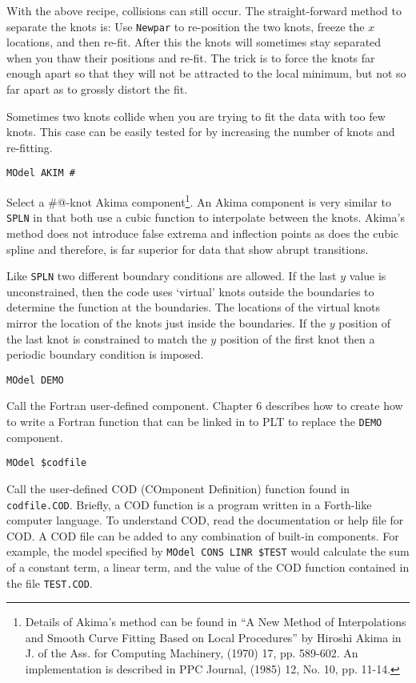 With the above recipe, collisions can still occur.  The straight-forward
method to separate the knots is:  Use {\tt Newpar} to re-position the two
knots, freeze the $x$ locations, and then re-fit.  After this the knots
will sometimes stay separated when you thaw their positions and re-fit.
The trick is to force the knots far enough apart so that they will
not be attracted to the local minimum, but not so far apart as to grossly
distort the fit.

Sometimes two knots collide when you are trying to fit the data with
too few knots.  This case can be easily tested for by increasing the
number of knots and re-fitting.

\medskip\begin{verbatim}
MOdel AKIM #
\end{verbatim}
Select a \verb@#@-knot Akima component\footnote{
Details of Akima's method can be found in ``A New Method of
Interpolations and Smooth Curve Fitting Based on Local Procedures''
by Hiroshi Akima in J.  of the Ass. for Computing Machinery,
(1970) 17, pp. 589-602.  An implementation is described in PPC Journal,
(1985) 12, No. 10, pp. 11-14.}.
An Akima component is very similar
to {\tt SPLN} in that both use a cubic function to interpolate between
the knots.  Akima's method does not introduce false extrema and
inflection points as does the cubic spline and therefore, is far
superior for data that show abrupt transitions.

Like {\tt SPLN} two different boundary conditions are allowed.  If the
last $y$ value is unconstrained, then the code uses `virtual' knots
outside the boundaries to determine the function at the boundaries.
The locations of the virtual knots mirror the location of the knots
just inside the boundaries.  If the $y$ position of the last knot is
constrained to match the $y$ position of the first knot then a periodic
boundary condition is imposed.

\medskip\begin{verbatim}
MOdel DEMO
\end{verbatim}
Call the Fortran user-defined component.  Chapter 6
describes how to create how to write a Fortran function that can
be linked in to PLT to replace the {\tt DEMO} component.

\medskip\begin{verbatim}
MOdel $codfile
\end{verbatim}
Call the user-defined COD (COmponent Definition) function found in
{\tt codfile.COD}.  Briefly, a COD function is a program written in a
Forth-like computer language.  To understand COD, read the documentation
or help file for COD.  A COD file can be added to any
combination of built-in components.  For example, the model specified by
{\tt MOdel~CONS~LINR~\$TEST} would calculate the sum of a constant term,
a linear term, and the value of the COD function contained in the
file {\tt TEST.COD}.

